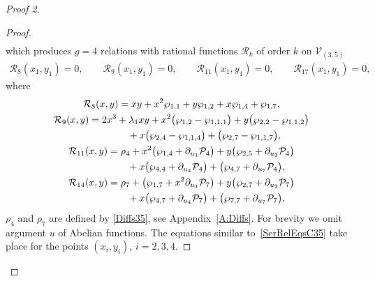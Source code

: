 \documentclass[pdftex]{sigma}
\numberwithin{equation}{section}
\begin{document}
\begin{proof}[Proof 2]
\begin{proof}
\begin{gather*}
\end{gather*}
which produces $g=4$ relations with rational functions $\mathcal{R}_k$ of order $k$ on $\mathcal{V}_{(3,5)}$
\begin{gather}\label{SerRelEqsC35}
 \mathcal{R}_8(x_1,y_1) = 0, \qquad \mathcal{R}_9(x_1,y_1) = 0, \qquad \mathcal{R}_{11}(x_1,y_1) = 0, \qquad \mathcal{R}_{17}(x_1,y_1) = 0,
\end{gather}
where
\begin{subequations}\label{RelC35}
 \begin{gather}
\mathcal{R}_8(x,y) = xy + x^2 \wp_{1,1} + y \wp_{1,2} + x \wp_{1,4} + \wp_{1,7},\label{R8RelC35}\\
\mathcal{R}_9(x,y) =2 x^3 +\lambda_1 xy + x^2 \big(\wp_{1,2} - \wp_{1,1,1}\big) + y\big(\wp_{2,2} - \wp_{1,1,2}\big) \nonumber\\
\hphantom{\mathcal{R}_9(x,y) =}{} + x\big(\wp_{2,4} - \wp_{1,1,4}\big) + \big(\wp_{2,7} - \wp_{1,1,7}\big), \label{R9RelC35} \\
\mathcal{R}_{11}(x,y) =\rho_4 + x^2 \big(\wp_{1,4} + \partial_{u_1} \mathcal{P}_4\big) + y \big(\wp_{2,5} + \partial_{u_2} \mathcal{P}_4\big) \nonumber\\
\hphantom{\mathcal{R}_{11}(x,y) =}{} + x \big(\wp_{4,4} + \partial_{u_4} \mathcal{P}_4\big) + \big(\wp_{4,7} + \partial_{u_7} \mathcal{P}_4\big), \label{R11RelC35} \\
\mathcal{R}_{14}(x,y) = \rho_7 + \big(\wp_{1,7} + x^2 \partial_{u_1} \mathcal{P}_7\big) + y\big(\wp_{2,7} + \partial_{u_2} \mathcal{P}_7\big)\nonumber\\
 \hphantom{\mathcal{R}_{14}(x,y) =}{} + x\big(\wp_{4,7} + \partial_{u_4} \mathcal{P}_7\big) + \big(\wp_{7,7} + \partial_{u_7} \mathcal{P}_7\big), \label{R14RelC35}
 \end{gather}
\end{subequations}
$\rho_4$ and $\rho_7$ are defined by \eqref{Diffs35}, see Appendix~\ref{A:Diffs}. For brevity we omit argument $u$ of Abelian functions. The equations similar to~\eqref{SerRelEqsC35} take place for the points $(x_i,y_i)$, $i=2,3,4$.


\end{proof}
\end{proof}
\end{document}
